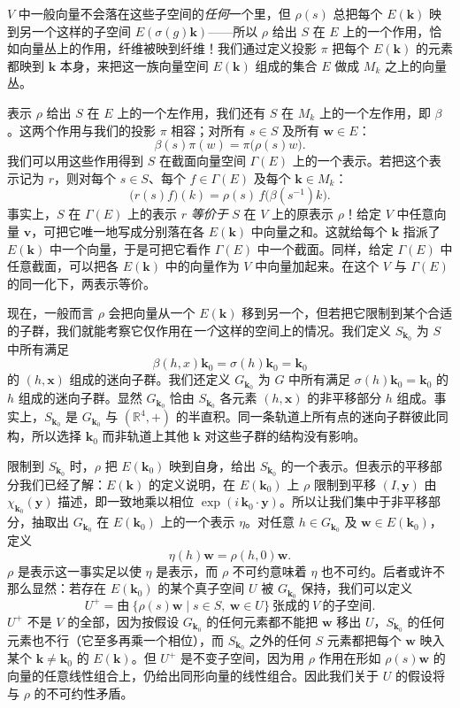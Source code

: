 $V$ 中一般向量不会落在这些子空间的\emph{任何}一个里，但 $\rho(s)$ 总把每个 $E(\mathbf{k})$ 映到另一个这样的子空间 $E(\sigma(g)\mathbf{k})$——所以 $\rho$ 给出 $S$ 在 $E$ 上的一个作用，恰如向量丛上的作用，纤维被映到纤维！我们通过定义投影 $\pi$ 把每个 $E(\mathbf{k})$ 的元素都映到 $\mathbf{k}$ 本身，来把这一族向量空间 $E(\mathbf{k})$ 组成的集合 $E$ 做成 $M_k$ 之上的向量丛。

表示 $\rho$ 给出 $S$ 在 $E$ 上的一个左作用，我们还有 $S$ 在 $M_k$ 上的一个左作用，即 $\beta$。这两个作用与我们的投影 $\pi$ 相容；对所有 $s\in S$ 及所有 $\mathbf{w}\in E$：
\[
\beta(s)\pi(w)=\pi\big(\rho(s)w\big).
\]
我们可以用这些作用得到 $S$ 在截面向量空间 $\Gamma(E)$ 上的一个表示。若把这个表示记为 $r$，则对每个 $s\in S$、每个 $f\in\Gamma(E)$ 及每个 $\mathbf{k}\in M_k$：
\[
\big(r(s)f\big)(k)=\rho(s)\,f\big(\beta(s^{-1})k\big).
\]
事实上，$S$ 在 $\Gamma(E)$ 上的表示 $r$ \emph{等价于} $S$ 在 $V$ 上的原表示 $\rho$！给定 $V$ 中任意向量 $\mathbf{v}$，可把它唯一地写成分别落在各 $E(\mathbf{k})$ 中向量之和。这就给每个 $\mathbf{k}$ 指派了 $E(\mathbf{k})$ 中一个向量，于是可把它看作 $\Gamma(E)$ 中一个截面。同样，给定 $\Gamma(E)$ 中任意截面，可以把各 $E(\mathbf{k})$ 中的向量作为 $V$ 中向量加起来。在这个 $V$ 与 $\Gamma(E)$ 的同一化下，两表示等价。

现在，一般而言 $\rho$ 会把向量从一个 $E(\mathbf{k})$ 移到另一个，但若把它限制到某个合适的子群，我们就能考察它仅作用在\emph{一个}这样的空间上的情况。我们定义 $S_{\mathbf{k}_0}$ 为 $S$ 中所有满足
\[
\beta(h,x)\mathbf{k}_0=\sigma(h)\mathbf{k}_0=\mathbf{k}_0
\]
的 $(h,\mathbf{x})$ 组成的迷向子群。我们还定义 $G_{\mathbf{k}_0}$ 为 $G$ 中所有满足 $\sigma(h)\mathbf{k}_0=\mathbf{k}_0$ 的 $h$ 组成的迷向子群。显然 $G_{\mathbf{k}_0}$ 恰由 $S_{\mathbf{k}_0}$ 各元素 $(h,\mathbf{x})$ 的非平移部分 $h$ 组成。事实上，$S_{\mathbf{k}_0}$ 是 $G_{\mathbf{k}_0}$ 与 $(\mathbb{R}^4,+)$ 的半直积。同一条轨道上所有点的迷向子群彼此同构，所以选择 $\mathbf{k}_0$ 而非轨道上其他 $\mathbf{k}$ 对这些子群的结构没有影响。

限制到 $S_{\mathbf{k}_0}$ 时，$\rho$ 把 $E(\mathbf{k}_0)$ 映到自身，给出 $S_{\mathbf{k}_0}$ 的一个表示。但表示的平移部分我们已经了解：$E(\mathbf{k})$ 的定义说明，在 $E(\mathbf{k}_0)$ 上 $\rho$ 限制到平移 $(I,\mathbf{y})$ 由 $\chi_{\mathbf{k}_0}(\mathbf{y})$ 描述，即一致地乘以相位 $\exp(i\,\mathbf{k}_0\cdot\mathbf{y})$。所以让我们集中于非平移部分，抽取出 $G_{\mathbf{k}_0}$ 在 $E(\mathbf{k}_0)$ 上的一个表示 $\eta$。对任意 $h\in G_{\mathbf{k}_0}$ 及 $\mathbf{w}\in E(\mathbf{k}_0)$，定义
\[
\eta(h)\mathbf{w}=\rho(h,0)\mathbf{w}.
\]
$\rho$ 是表示这一事实足以使 $\eta$ 是表示，而 $\rho$ 不可约意味着 $\eta$ 也不可约。后者或许不那么显然：若存在 $E(\mathbf{k}_0)$ 的某个真子空间 $U$ 被 $G_{\mathbf{k}_0}$ 保持，我们可以定义
\[
U^{+}=\text{由}\ \{\rho(s)\mathbf{w}\mid s\in S,\ \mathbf{w}\in U\}\ \text{张成的}\ V\ \text{的子空间}.
\]
$U^{+}$ 不是 $V$ 的全部，因为按假设 $G_{\mathbf{k}_0}$ 的任何元素都不能把 $\mathbf{w}$ 移出 $U$，$S_{\mathbf{k}_0}$ 的任何元素也不行（它至多再乘一个相位），而 $S_{\mathbf{k}_0}$ 之外的任何 $S$ 元素都把每个 $\mathbf{w}$ 映入某个 $\mathbf{k}\neq\mathbf{k}_0$ 的 $E(\mathbf{k})$。但 $U^{+}$ 是不变子空间，因为用 $\rho$ 作用在形如 $\rho(s)\mathbf{w}$ 的向量的任意线性组合上，仍给出同形向量的线性组合。因此我们关于 $U$ 的假设将与 $\rho$ 的不可约性矛盾。

